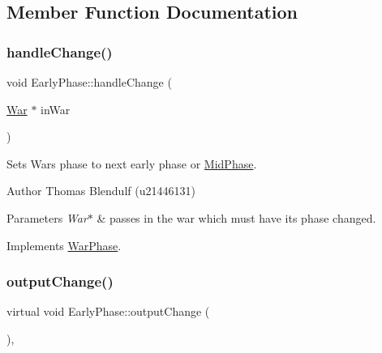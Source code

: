 \subsection{Member Function Documentation}
\mbox{\label{class_early_phase_a2f5485add7def09e0ec0538c552c88d8}} 
\subsubsection{\texorpdfstring{handleChange()}{handleChange()}}
{\footnotesize\ttfamily void Early\+Phase\+::handle\+Change (\begin{DoxyParamCaption}\item[{\mbox{\hyperlink{class_war}{War}} $\ast$}]{in\+War }\end{DoxyParamCaption})\hspace{0.3cm}{\ttfamily [virtual]}}



Sets Wars phase to next early phase or \mbox{\hyperlink{class_mid_phase}{Mid\+Phase}}. 

\begin{DoxyAuthor}{Author}
Thomas Blendulf (u21446131) 
\end{DoxyAuthor}

\begin{DoxyParams}{Parameters}
{\em War$\ast$} & passes in the war which must have its phase changed. \\
\hline
\end{DoxyParams}


Implements \mbox{\hyperlink{class_war_phase_a258e9480c7b3dcbdebdf86863659f1e5}{War\+Phase}}.

\mbox{\label{class_early_phase_a4dec6915b8c177199bc2b92a49fdb3af}} 
\subsubsection{\texorpdfstring{outputChange()}{outputChange()}}
{\footnotesize\ttfamily virtual void Early\+Phase\+::output\+Change (\begin{DoxyParamCaption}{ }\end{DoxyParamCaption})\hspace{0.3cm}{\ttfamily [inline]}, {\ttfamily [virtual]}}



